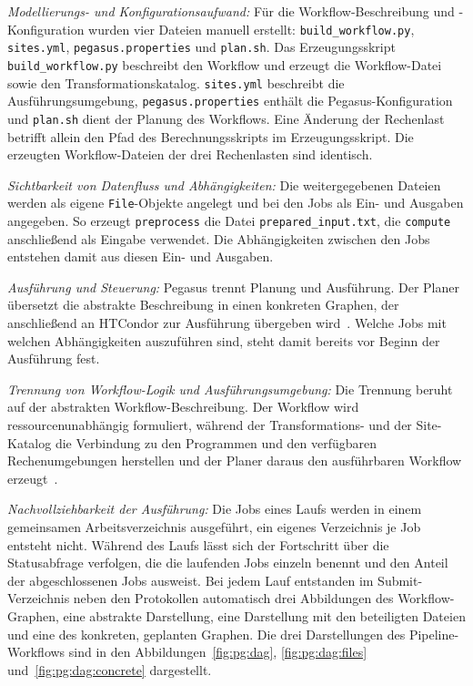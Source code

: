 \begin{sloppypar}
\emph{Modellierungs- und Konfigurationsaufwand:} Für die
Workflow-Beschreibung und -Konfiguration wurden vier Dateien
manuell erstellt: \texttt{build\_workflow.py}, \texttt{sites.yml},
\texttt{pegasus.properties} und \texttt{plan.sh}. Das
Erzeugungsskript \texttt{build\_workflow.py} beschreibt den Workflow
und erzeugt die Workflow-Datei sowie den Transformationskatalog.
\texttt{sites.yml} beschreibt die Ausführungsumgebung,
\texttt{pegasus.properties} enthält die Pegasus-Konfiguration und
\texttt{plan.sh} dient der Planung des Workflows. Eine Änderung der
Rechenlast betrifft allein den Pfad des Berechnungsskripts im
Erzeugungsskript. Die erzeugten Workflow-Dateien der drei
Rechenlasten sind identisch.
\end{sloppypar}

\emph{Sichtbarkeit von Datenfluss und Abhängigkeiten:} Die
weitergegebenen Dateien werden als eigene \texttt{File}-Objekte
angelegt und bei den Jobs als Ein- und Ausgaben angegeben. So
erzeugt \texttt{preprocess} die Datei
\texttt{prepared\_input.txt}, die \texttt{compute} anschließend als
Eingabe verwendet. Die Abhängigkeiten zwischen den Jobs entstehen
damit aus diesen Ein- und Ausgaben.

\emph{Ausführung und Steuerung:} Pegasus trennt Planung und
Ausführung. Der Planer übersetzt die abstrakte Beschreibung in einen
konkreten Graphen, der anschließend an HTCondor zur Ausführung
übergeben wird~\cite[S.~20]{deelman2015pegasus}. Welche Jobs mit welchen
Abhängigkeiten auszuführen sind, steht damit bereits vor Beginn der
Ausführung fest.

\emph{Trennung von Workflow-Logik und Ausführungsumgebung:} Die
Trennung beruht auf der abstrakten Workflow-Beschreibung. Der
Workflow wird ressourcenunabhängig formuliert, während der
Transformations- und der Site-Katalog die Verbindung zu den
Programmen und den verfügbaren Rechenumgebungen herstellen und der
Planer daraus den ausführbaren Workflow
erzeugt~\cite[S.~18--20]{deelman2015pegasus}.


\emph{Nachvollziehbarkeit der Ausführung:} Die Jobs eines Laufs
werden in einem gemeinsamen Arbeitsverzeichnis ausgeführt, ein
eigenes Verzeichnis je Job entsteht nicht. Während des Laufs lässt
sich der Fortschritt über die Statusabfrage verfolgen, die die
laufenden Jobs einzeln benennt und den Anteil der abgeschlossenen
Jobs ausweist. Bei jedem Lauf entstanden
im Submit-Verzeichnis neben den Protokollen automatisch drei
Abbildungen des Workflow-Graphen, eine abstrakte Darstellung, eine
Darstellung mit den beteiligten Dateien und eine des konkreten,
geplanten Graphen. Die drei Darstellungen des
Pipeline-Workflows sind in den Abbildungen~\ref{fig:pg:dag},
\ref{fig:pg:dag:files} und~\ref{fig:pg:dag:concrete} dargestellt.

